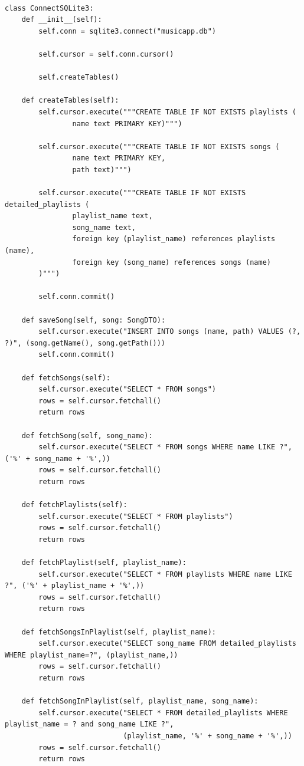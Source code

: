 \documentclass[a4paper]{article}
\begin{document}
\begin{mdframed}[hidealllines=true,backgroundcolor=magenta!10]
\begin{lstlisting}

class ConnectSQLite3:
    def __init__(self):
        self.conn = sqlite3.connect("musicapp.db")

        self.cursor = self.conn.cursor()

        self.createTables()

    def createTables(self):
        self.cursor.execute("""CREATE TABLE IF NOT EXISTS playlists (
                name text PRIMARY KEY)""")

        self.cursor.execute("""CREATE TABLE IF NOT EXISTS songs (
                name text PRIMARY KEY,
                path text)""")

        self.cursor.execute("""CREATE TABLE IF NOT EXISTS detailed_playlists (
                playlist_name text,
                song_name text,
                foreign key (playlist_name) references playlists (name),
                foreign key (song_name) references songs (name)
        )""")

        self.conn.commit()

    def saveSong(self, song: SongDTO):
        self.cursor.execute("INSERT INTO songs (name, path) VALUES (?, ?)", (song.getName(), song.getPath()))
        self.conn.commit()

    def fetchSongs(self):
        self.cursor.execute("SELECT * FROM songs")
        rows = self.cursor.fetchall()
        return rows

    def fetchSong(self, song_name):
        self.cursor.execute("SELECT * FROM songs WHERE name LIKE ?", ('%' + song_name + '%',))
        rows = self.cursor.fetchall()
        return rows

    def fetchPlaylists(self):
        self.cursor.execute("SELECT * FROM playlists")
        rows = self.cursor.fetchall()
        return rows

    def fetchPlaylist(self, playlist_name):
        self.cursor.execute("SELECT * FROM playlists WHERE name LIKE ?", ('%' + playlist_name + '%',))
        rows = self.cursor.fetchall()
        return rows

    def fetchSongsInPlaylist(self, playlist_name):
        self.cursor.execute("SELECT song_name FROM detailed_playlists WHERE playlist_name=?", (playlist_name,))
        rows = self.cursor.fetchall()
        return rows

    def fetchSongInPlaylist(self, playlist_name, song_name):
        self.cursor.execute("SELECT * FROM detailed_playlists WHERE playlist_name = ? and song_name LIKE ?", 
                            (playlist_name, '%' + song_name + '%',))
        rows = self.cursor.fetchall()
        return rows



\end{lstlisting}
\end{mdframed}
\end{document}

